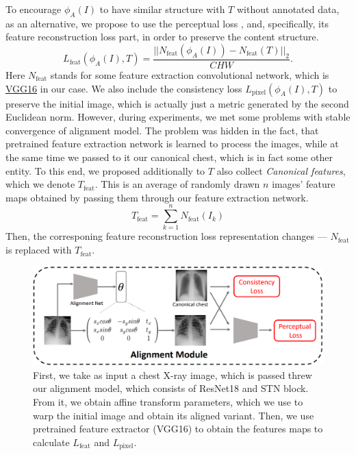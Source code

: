 \documentclass{article}
\begin{document}
To encourage $ \phi_A(I) $ to have similar structure with $ T $ without annotated 
 data, as an alternative, we propose to use the perceptual loss \cite{StyleTransfer},
 and, specifically, its feature reconstruction loss part, in order to preserve the
 content structure.
\begin{equation}
    L_{\text{feat}}(\phi_A(I), T) = \frac{|| N_{\text{feat}}(\phi_A(I)) -
    N_{\text{feat}}(T) ||_2}{CHW}.
\end{equation}
Here $ N_{\text{feat}} $ stands for some feature extraction convolutional network, 
 which is \href{https://pytorch.org/vision/stable/models/generated/torchvision.models.vgg16.html?highlight=vgg}{VGG16} 
 in our case. We also include the consistency loss $ L_{\text{pixel}}(\phi_A(I), T) $ to preserve the
 initial image, which is actually just a metric generated by the second Euclidean norm.
 However, during experiments, we met some problems with stable convergence of 
 alignment model. The problem was hidden in the fact, that pretrained feature 
 extraction network is learned to process the images, while at the same time we 
 passed to it our canonical chest, which is in fact some other entity. To this end,
 we proposed additionally to $ T $ also collect \textit{Canonical features}, which
 we denote $ T_{\text{feat}} $. This is an average of randomly drawn $ n $ images' feature 
 maps obtained by passing them through our feature extraction network.
\begin{equation}
    T_{\text{feat}} = \sum_{k = 1}^{n} N_{\text{feat}}(I_k) 
\end{equation}
Then, the corresponing feature reconstruction loss representation changes --- $N_{\text{feat}}$
is replaced with $T_{\text{feat}}$.

\begin{figure}[ht]\label{overall_architecture}
    \vskip 0.2in
    \begin{center}
    \centerline{\includegraphics[width=\columnwidth * 2]{../images/overall_pipeline.png}}
    \caption{First, we take as input a chest X-ray image, which is passed threw our alignment 
    model, which consists of ResNet18 and STN block. From it, we obtain affine transform 
    parameters, which we use to warp the initial image and obtain its aligned variant. 
    Then, we use pretrained feature extractor (VGG16) to obtain the features maps to 
    calculate $L_{\text{feat}}$ and $ L_{\text{pixel}} $.}
    \end{center}
    \vskip -0.2in
\end{figure}
\end{document}
